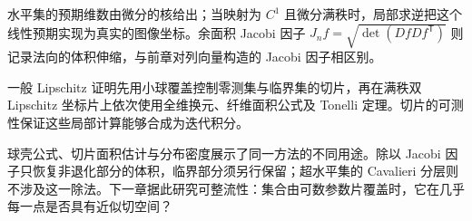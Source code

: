 


\begin{chaptersummary}
水平集的预期维数由微分的核给出；当映射为 \(C^1\) 且微分满秩时，局部求逆把这个线性预期实现为真实的图像坐标。余面积 Jacobi 因子 \(J_nf=\sqrt{\det(DfDf^{\mathsf T})}\) 则记录法向的体积伸缩，与前章对列向量构造的 Jacobi 因子相区别。

\ProseParagraphBreak

一般 Lipschitz 证明先用小球覆盖控制零测集与临界集的切片，再在满秩双 Lipschitz 坐标片上依次使用全维换元、纤维面积公式及 Tonelli 定理。切片的可测性保证这些局部计算能够合成为迭代积分。

\ProseParagraphBreak

球壳公式、切片面积估计与分布密度展示了同一方法的不同用途。除以 Jacobi 因子只恢复非退化部分的体积，临界部分须另行保留；超水平集的 Cavalieri 分层则不涉及这一除法。下一章据此研究可整流性：集合由可数参数片覆盖时，它在几乎每一点是否具有近似切空间？
\end{chaptersummary}


\BookExercises


